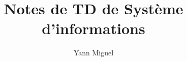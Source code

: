 \documentclass[a4paper, 12pt]{article}
\title{Notes de TD de Syst\`eme d'informations}
\author{Yann Miguel}
\begin{document}
\ttfamily
\maketitle
\tableofcontents
\newpage



\end{document}
